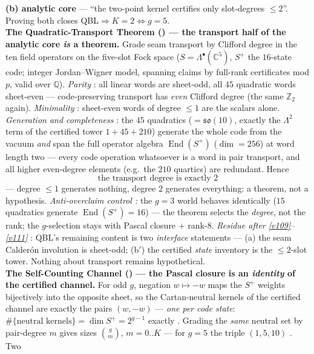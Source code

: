 \documentclass[11pt,a4paper]{article}
\newcommand{\Z}{\mathbb{Z}}
\theoremstyle{definition}
\begin{document}
\begin{keybox}
\textbf{(b) analytic core} --- ``the two-point kernel certifies only slot-degrees $\le2$''. Proving
both closes QBL${}\Rightarrow K{=}2\Leftrightarrow g{=}5$.
\smallskip\\
\noindent\textbf{The Quadratic-Transport Theorem () --- the
transport half of the analytic core \emph{is} a theorem.} Grade seam transport by Clifford degree in
the ten field operators on the five-slot Fock space ($S=\Lambda^\bullet(\mathbb C^5)$, $S^+$ the
$16$-state code; integer Jordan--Wigner model, spanning claims by full-rank certificates mod $p$,
valid over $\mathbb Q$). \emph{Parity} \mE: all linear words are sheet-odd, all $45$ quadratic words
sheet-even --- code-preserving transport has \emph{even} Clifford degree (the same $\Z_2$ again).
\emph{Minimality} \mE: sheet-even words of degree $\le1$ are the scalars alone. \emph{Generation and
completeness} \mE: the $45$ quadratics ($=\mathfrak{so}(10)$, exactly the $\Lambda^2$ term of the
certified tower $1+45+210$) generate the whole code from the vacuum \emph{and} span the full operator
algebra $\operatorname{End}(S^+)$ ($\dim=256$) at word length two --- every code operation whatsoever
is a word in pair transport, and all higher even-degree elements (e.g.\ the $210$ quartics) are
redundant. Hence
\[
  \boxed{\ \text{the transport degree is exactly }2\ }
\]
--- degree $\le1$ generates nothing, degree $2$ generates everything: a theorem, not a hypothesis.
\emph{Anti-overclaim control \mE:} the $g=3$ world behaves identically ($15$ quadratics generate
$\operatorname{End}(S^+)=16$) --- the theorem selects the \emph{degree}, not the rank; the
$g$-selection stays with Pascal closure $+$ rank-$8$. \emph{Residue after \vref{v109}--\vref{v111}} \mC: QBL's
remaining content is two \emph{interface} statements --- (a) the seam Calder\'on involution is
sheet-odd; (b$'$) the certified \emph{state} inventory is the $\le2$-slot tower. Nothing about
transport remains hypothetical.
\smallskip\\
\noindent\textbf{The Self-Counting Channel () --- the Pascal
closure is an \emph{identity} of the certified channel.} For odd $g$, negation $w\mapsto-w$ maps the
$S^+$ weights bijectively into the opposite sheet, so the Cartan-neutral kernels of the certified
channel are exactly the pairs $(w,-w)$ --- \emph{one per code state}:
$\#\{\text{neutral kernels}\}=\dim S^+=2^{g-1}$ exactly \mE. Grading the \emph{same} neutral set by
pair-degree $m$ gives sizes $\binom gm$, $m=0..K$ --- for $g=5$ the triple $(1,5,10)$ \mE. Two

\end{keybox}
\end{document}
